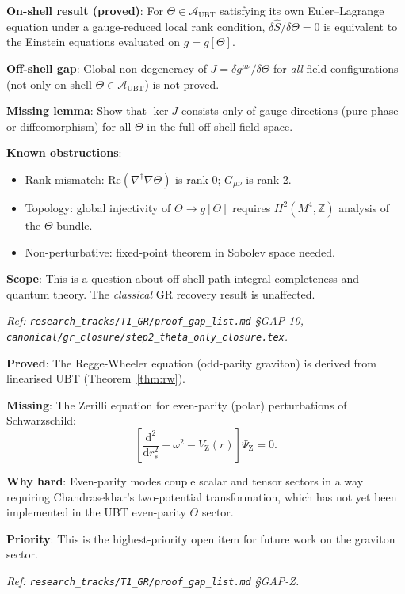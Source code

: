 \documentclass[12pt,a4paper]{article}
\theoremstyle{definition}
\theoremstyle{remark}
\newcommand{\OPEN}{\textbf{[Open]}}
\begin{document}
\begin{tcolorbox}[colback=red!4!white,colframe=red!55!black,
  title=GAP-10: Off-Shell $\Theta$-Only Closure \OPEN,breakable]

\textbf{On-shell result (proved)}: For $\Theta\in\mathcal{A}_{\mathrm{UBT}}$
satisfying its own Euler--Lagrange equation under a gauge-reduced local rank
condition, $\delta\hat{S}/\delta\Theta=0$ is equivalent to the Einstein equations
evaluated on $g=g[\Theta]$.

\smallskip
\textbf{Off-shell gap}: Global non-degeneracy of
$J=\delta g^{\mu\nu}/\delta\Theta$ for \emph{all} field configurations
(not only on-shell $\Theta\in\mathcal{A}_{\mathrm{UBT}}$) is not proved.

\smallskip
\textbf{Missing lemma}: Show that $\ker J$ consists only of gauge directions
(pure phase or diffeomorphism) for all $\Theta$ in the full off-shell field
space.

\smallskip
\textbf{Known obstructions}:
\begin{itemize}
  \item Rank mismatch: $\mathrm{Re}(\nabla^\dagger\nabla\Theta)$ is
        rank-0; $G_{\mu\nu}$ is rank-2.
  \item Topology: global injectivity of $\Theta\to g[\Theta]$ requires
        $H^2(M^4,\mathbb{Z})$ analysis of the $\Theta$-bundle.
  \item Non-perturbative: fixed-point theorem in Sobolev space needed.
\end{itemize}

\smallskip
\textbf{Scope}: This is a question about off-shell path-integral completeness
and quantum theory.  The \emph{classical} GR recovery result is unaffected.

\smallskip
\textit{Ref: \texttt{research\_tracks/T1\_GR/proof\_gap\_list.md} §GAP-10,
\texttt{canonical/gr\_closure/step2\_theta\_only\_closure.tex}.}
\end{tcolorbox}

\begin{tcolorbox}[colback=orange!4!white,colframe=orange!55!black,
  title=GAP-Z: Zerilli Equation (Even-Parity Graviton) \OPEN]

\textbf{Proved}: The Regge-Wheeler equation (odd-parity graviton) is
derived from linearised UBT (Theorem~\ref{thm:rw}).

\smallskip
\textbf{Missing}: The Zerilli equation for even-parity (polar)
perturbations of Schwarzschild:
\[
  \left[\frac{\mathrm{d}^2}{\mathrm{d}r_*^2} + \omega^2
        - V_{\mathrm{Z}}(r)\right]\Psi_{\mathrm{Z}} = 0.
\]

\smallskip
\textbf{Why hard}: Even-parity modes couple scalar and tensor sectors
in a way requiring Chandrasekhar's two-potential transformation, which
has not yet been implemented in the UBT even-parity $\Theta$ sector.

\smallskip
\textbf{Priority}: This is the highest-priority open item for future work
on the graviton sector.

\smallskip
\textit{Ref: \texttt{research\_tracks/T1\_GR/proof\_gap\_list.md} §GAP-Z.}
\end{tcolorbox}
\end{document}
